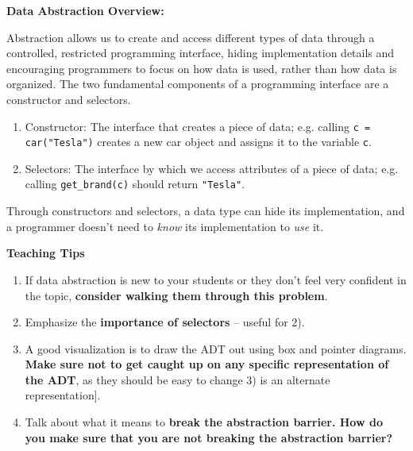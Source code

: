 \textbf{Data Abstraction Overview:}

Abstraction allows us to create and access different types of data through a controlled, restricted programming interface, hiding implementation details and encouraging programmers to focus on how data is used, rather than how data is organized. The two fundamental components of a programming interface are a constructor and selectors.
\begin{enumerate}
	\item Constructor: The interface that creates a piece of data; e.g. calling \texttt{c = car("Tesla")} creates a new car object and assigns it to the variable \texttt{c}.
	\item Selectors: The interface by which we access attributes of a piece of data; e.g. calling \lstinline{get_brand(c)} should return \lstinline{"Tesla"}.
\end{enumerate}

Through constructors and selectors, a data type can hide its implementation, and a programmer doesn’t need to {\it know} its implementation to {\it use} it.

\begin{blocksection}
	\begin{guide}
	\textbf{Teaching Tips}
	\begin{enumerate}
		\item If data abstraction is new to your students or they don’t feel very confident in the topic, \textbf{consider walking them through this problem}.
        \item Emphasize the \textbf{importance of selectors} -- useful for 2).
        \item A good visualization is to draw the ADT out using box and pointer diagrams. \textbf{Make sure not to get caught up on any specific representation of the ADT}, as they should be easy to change 3) is an alternate representation].
        \item Talk about what it means to \textbf{break the abstraction barrier. How do you make sure that you are not breaking the abstraction barrier?}
	\end{enumerate}
	\end{guide}
\end{blocksection}
